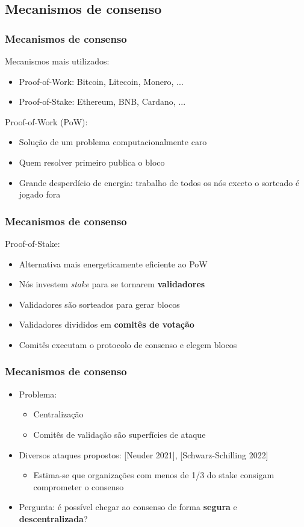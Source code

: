 \documentclass{beamer}
\begin{document}
\subsection{Mecanismos de consenso}
\begin{frame}
\frametitle{Mecanismos de consenso}
Mecanismos mais utilizados:

\begin{itemize}
    \item Proof-of-Work: Bitcoin, Litecoin, Monero, ...
    \item Proof-of-Stake: Ethereum, BNB, Cardano, ...
\end{itemize}

Proof-of-Work (PoW):
\begin{itemize}
    \item Solução de um problema computacionalmente caro
    \item Quem resolver primeiro publica o bloco
    \item Grande desperdício de energia: trabalho de todos os nós exceto o sorteado é jogado fora
\end{itemize}
\end{frame}

\begin{frame}
\frametitle{Mecanismos de consenso}
Proof-of-Stake:
\begin{itemize}
    \item Alternativa mais energeticamente eficiente ao PoW
    \item Nós investem \textit{stake} para se tornarem \textbf{validadores}
    \item Validadores são sorteados para gerar blocos
    \item Validadores divididos em \textbf{comitês de votação}
    \item Comitês executam o protocolo de consenso e elegem blocos
\end{itemize}
\end{frame}

\begin{frame}
\frametitle{Mecanismos de consenso}
\begin{itemize}
    \item Problema:
    \begin{itemize}
        \item Centralização
        \item Comitês de validação são superfícies de ataque
    \end{itemize}
    \item Diversos ataques propostos: [Neuder 2021], [Schwarz-Schilling 2022]
    \begin{itemize}
        \item Estima-se que organizações com menos de 1/3 do stake consigam comprometer o consenso
    \end{itemize}
    \item Pergunta: é possível chegar ao consenso de forma \textbf{segura} e \textbf{descentralizada}?
\end{itemize}
\end{frame}
\end{document}

